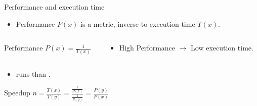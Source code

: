\begin{frame}[t]{Performance and execution time}
\begin{itemize}
  \item Performance $P(x)$ is a metric, inverse to
        execution time $T(x)$.
\end{itemize}

\begin{columns}
\begin{column}{.4\textwidth}
\begin{block}{Performance}
\begin{math}
P(x) = \frac{1}{T(x)}
\end{math}
\end{block}
\end{column}
\begin{column}{.6\textwidth}
\begin{itemize}
  \item High Performance $\rightarrow$ Low execution time.
\end{itemize}
\end{column}
\end{columns}

\begin{itemize}
  \item {} runs   than .
\end{itemize}
\begin{block}{Speedup}
\begin{math}
n=\frac{T(x)}{T(y)}=
\frac{
\frac{1}{P(x)}
}{
\frac{1}{P(y)}
}
=
\frac{P(y)}{P(x)}
\end{math}
\end{block}
\end{frame}

